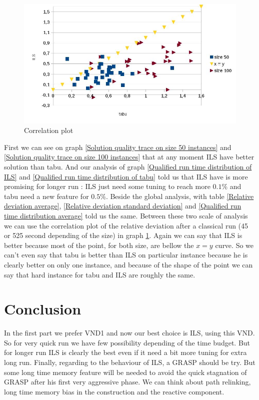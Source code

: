 \documentclass[12pt,a4paper]{article}
\begin{document}
\begin{figure}[!h]
\centering
\includegraphics[scale=0.5]{vrai_correlation_plot.jpg}
\caption{Correlation plot}
\label{Correlation plot}
\end{figure}

First we can see on graph \ref{Solution quality trace on size 50 instances} and \ref{Solution quality trace on size 100 instances} that at any moment ILS have better solution than tabu. And our analysis of graph \ref{Qualified run time distribution of ILS} and \ref{Qualified run time distribution of tabu} told us that ILS have is more promising for longer run : ILS just need some tuning to reach more $0.1 \%$ and tabu need a new feature for $0.5 \%$. Beside the global analysis, with table \ref{Relative deviation average}, \ref{Relative deviation standard deviation} and \ref{Qualified run time distribution average} told us the same. Between these two scale of analysis we can use the correlation plot of the relative deviation after a classical run (45 or 525 second depending of the size) in graph \ref{Correlation plot}. Again we can say that ILS is better because most of the point, for both size, are bellow the $x = y$ curve. So we can't even say that tabu is better than ILS on particular instance because he is clearly better on only one instance, and because of the shape of the point we can say that hard instance for tabu and ILS are roughly the same.

\section*{Conclusion}

In the first part we prefer VND1 and now our best choice is ILS, using this VND. So for very quick run we have few possibility depending of the time budget. But for longer run ILS is clearly the best even if it need a bit more tuning for extra long run. Finally, regarding to the behaviour of ILS, a GRASP should be try. But some long time memory feature will be needed to avoid the quick stagnation of GRASP after his first very aggressive phase. We can think about path relinking, long time memory bias in the construction and the reactive component. 



\end{document}
